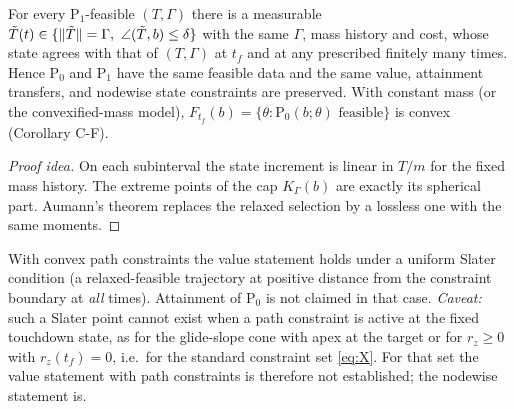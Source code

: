 \begin{theorem}\label{thm:CW}
For every $\mathrm P_1$-feasible $(T,\Gamma)$ there is a measurable $\tilde T(t)\in\{\lVert \tilde T\rVert=\Gamma,\ \angle(\tilde T,b)\le\delta\}$
with the same $\Gamma$, mass history and cost, whose state agrees with that of $(T,\Gamma)$ at $t_f$ and at any prescribed
finitely many times. Hence $\mathrm P_0$ and $\mathrm P_1$ have the same feasible data and the same value, attainment transfers,
and nodewise state constraints are preserved. With constant mass (or the convexified-mass model),
$F_{t_f}(b)=\{\theta:\mathrm P_0(b;\theta)\text{ feasible}\}$ is convex (Corollary C-F).\Sproved\
\end{theorem}
\begin{proof}[Proof idea]
On each subinterval the state increment is linear in $T/m$ for the fixed mass history. The extreme points of the cap
$K_\Gamma(b)$ are exactly its spherical part. Aumann's theorem replaces the relaxed selection by a lossless one with the
same moments.
\end{proof}
With convex path constraints the value statement holds under a uniform Slater condition (a relaxed-feasible trajectory at
positive distance from the constraint boundary at \emph{all} times). Attainment of $\mathrm P_0$ is not claimed in that case.
\emph{Caveat:} such a Slater point cannot exist when a path constraint is active at the fixed touchdown state, as for the
glide-slope cone with apex at the target or for $r_z\ge0$ with $r_z(t_f)=0$, i.e.\ for the standard constraint set
\eqref{eq:X}. For that set the value statement with path constraints is therefore not established; the nodewise statement
is.

